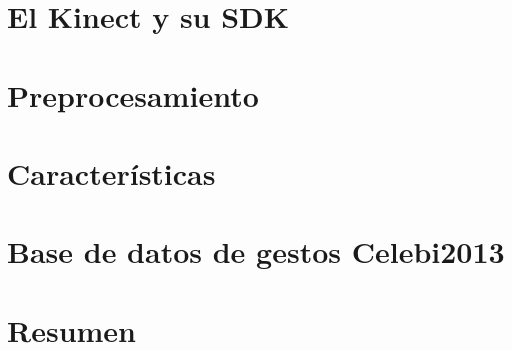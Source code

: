 \section{El Kinect y su SDK}

\section{Preprocesamiento}

\section{Características}

\section{Base de datos de gestos Celebi2013 }

\section{Resumen}

